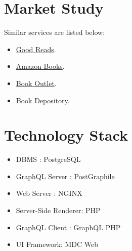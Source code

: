\documentclass{article}
\begin{document}
\section{Market Study}

Similar services are listed below:

\begin{itemize}
\item \href{https://www.goodreads.com/}{Good Reads}.
\item \href{https://www.amazon.com/books}{Amazon Books}.
\item \href{https://bookoutlet.com/}{Book Outlet}.
\item \href{https://www.bookdepository.com/}{Book Depository}.
\end{itemize}

\section{Technology Stack}

\begin{itemize}
\item DBMS : PostgreSQL
\item GraphQL Server : PostGraphile
\item Web Server : NGINX
\item Server-Side Renderer: PHP
\item GraphQL Client : GraphQL PHP
\item UI Framework: MDC Web
\end{itemize}
\end{document}
